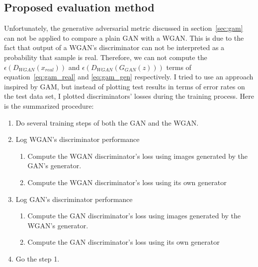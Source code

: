 \subsection{Proposed evaluation method}
Unfortunately, the generative adversarial metric discussed in section~\ref{sec:gam} can not be applied to compare a plain GAN with a WGAN. This is due to the fact that output of a WGAN's discriminator can not be interpreted as a probability that sample is real. Therefore, we can not compute the $\epsilon(D_{WGAN}(x_{real}))$ and $\epsilon(D_{WGAN}(G_{GAN}(z)))$ terms of equation~\ref{eq:gam_real} and \ref{eq:gam_gen} respectively. I tried to use an approach inspired by GAM, but instead of plotting test results in terms of error rates on the test data set, I plotted discriminators' losses during the training process. Here is the summarized procedure: 
\begin{enumerate}
	\item Do several training steps of both the GAN and the WGAN.
	\item Log WGAN's discriminator performance 
		\begin{enumerate}
			\item Compute the WGAN discriminator's loss using images generated by the GAN's generator.
			\item Compute the WGAN discriminator's loss using its own generator
		\end{enumerate}	
	\item Log GAN's discriminator performance
		\begin{enumerate}
			\item Compute the GAN discriminator's loss using images generated by the WGAN's generator.
			\item Compute the GAN discriminator's loss using its own generator
		\end{enumerate}
	\item Go the step 1.
\end{enumerate}

